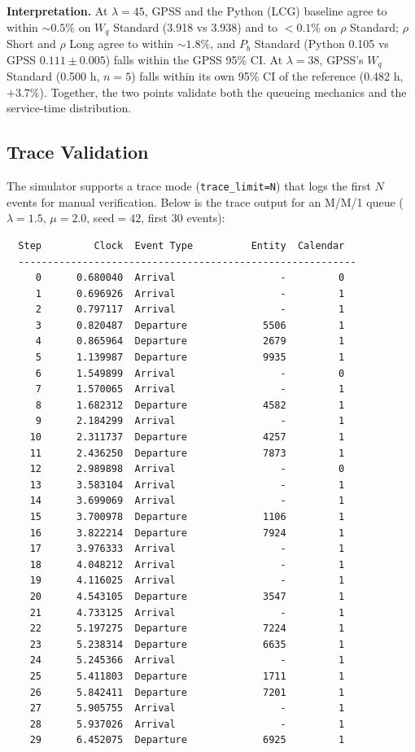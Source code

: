 \documentclass[11pt,a4paper]{article}
\newcommand{\Wq}{\ensuremath{W_q}}
\newcommand{\Pb}{\ensuremath{P_b}}
\newcommand{\lam}{\ensuremath{\lambda}}
\newcommand{\murate}{\ensuremath{\mu}}
\begin{document}
\textbf{Interpretation.} At $\lam=45$, GPSS and the Python (LCG) baseline agree to within ${\sim}0.5\%$
on $\Wq$ Standard (3.918 vs 3.938) and to $<0.1\%$ on $\rho$ Standard; $\rho$ Short and $\rho$ Long agree
to within ${\sim}1.8\%$, and $\Pb$ Standard (Python 0.105 vs GPSS $0.111 \pm 0.005$) falls within the
GPSS 95\% CI. At $\lam=38$, GPSS's $\Wq$ Standard (0.500 h, $n=5$) falls within its own 95\% CI of the
reference (0.482 h, $+3.7\%$). Together, the two points validate both the queueing mechanics and the
service-time distribution.

\subsection{Trace Validation}

The simulator supports a trace mode (\texttt{trace\_limit=N}) that logs the first $N$ events for manual
verification. Below is the trace output for an M/M/1 queue ($\lam=1.5$, $\murate=2.0$, seed$=42$,
first 30 events):

\begin{lstlisting}
  Step         Clock  Event Type          Entity  Calendar
  ----------------------------------------------------------
     0      0.680040  Arrival                  -         0
     1      0.696926  Arrival                  -         1
     2      0.797117  Arrival                  -         1
     3      0.820487  Departure             5506         1
     4      0.865964  Departure             2679         1
     5      1.139987  Departure             9935         1
     6      1.549899  Arrival                  -         0
     7      1.570065  Arrival                  -         1
     8      1.682312  Departure             4582         1
     9      2.184299  Arrival                  -         1
    10      2.311737  Departure             4257         1
    11      2.436250  Departure             7873         1
    12      2.989898  Arrival                  -         0
    13      3.583104  Arrival                  -         1
    14      3.699069  Arrival                  -         1
    15      3.700978  Departure             1106         1
    16      3.822214  Departure             7924         1
    17      3.976333  Arrival                  -         1
    18      4.048212  Arrival                  -         1
    19      4.116025  Arrival                  -         1
    20      4.543105  Departure             3547         1
    21      4.733125  Arrival                  -         1
    22      5.197275  Departure             7224         1
    23      5.238314  Departure             6635         1
    24      5.245366  Arrival                  -         1
    25      5.411803  Departure             1711         1
    26      5.842411  Departure             7201         1
    27      5.905755  Arrival                  -         1
    28      5.937026  Arrival                  -         1
    29      6.452075  Departure             6925         1
\end{lstlisting}
\end{document}
